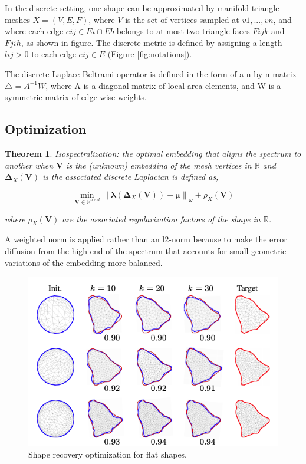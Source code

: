 \documentclass[a4paper,10pt]{article}
\newtheorem{theorem}{Theorem}
\begin{document}
In the discrete setting, one shape can be approximated by manifold triangle meshes $ X = (V, E, F) $,
where $ V $ is the set of vertices sampled at $ v1, ..., vn $, and where each edge $ eij \in Ei  \cap Eb $ belongs
to at most two triangle faces $Fijk$ and $Fjih$, as shown in figure. The discrete metric is defined by assigning a length $lij > 0$
 to each edge $eij \in E$ (Figure \ref{fig:notations}).
 
  The discrete Laplace-Beltrami operator is defined in the form of a n by n matrix $\triangle = A^{-1}W$, where A
is a diagonal matrix of local area elements, and W is a symmetric matrix of
edge-wise weights.

\subsection{Optimization}

\begin{theorem}
Isospectralization: the optimal embedding that aligns the spectrum to another when $\mathbf{V}$ is the (unknown) embedding of the mesh vertices in $\mathbb{R}$ and $\boldsymbol{\Delta}_{X}(\mathbf{V})$ is the associated discrete Laplacian is defined as,

\begin{equation}
\min _{\mathbf{V} \in \mathbb{R}^{n \times d}}\left\|\boldsymbol{\lambda}\left(\boldsymbol{\Delta}_{X}(\mathbf{V})\right)-\boldsymbol{\mu}\right\|_{\omega}+\rho_{X}(\mathbf{V}) 
\end{equation}

where $\rho_{X}(\mathbf{V})$ are the associated regularization factors of the shape in $\mathbb{R}$.
\end{theorem}

A weighted norm is applied rather than an l2-norm because to make the error diffusion from  the high end of the spectrum that accounts for small geometric variations of the embedding more balanced.

\begin{figure}[hbt!]
 \includegraphics[height=0.5\textwidth,keepaspectratio]{Flatshapes}
 \centering
 \caption{\label{fig:Flatshapes} Shape recovery optimization for flat shapes.}
\end{figure}
\end{document}
